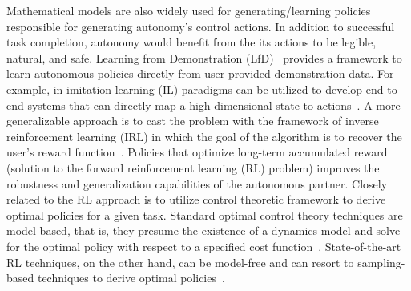 \documentclass[12pt]{article}
\begin{document}
Mathematical models are also widely used for generating/learning policies responsible for generating autonomy's control actions. In addition to successful task completion, autonomy would benefit from the its actions to be legible, natural, and safe. Learning from Demonstration (LfD)~\cite{argall2009survey} provides a framework to learn autonomous policies directly from user-provided demonstration data. For example, in imitation learning (IL) paradigms can be utilized to develop end-to-end systems that can directly map a high dimensional state to actions~\cite{bojarski2016end}. A more generalizable approach is to cast the problem with the framework of inverse reinforcement learning (IRL) in which the goal of the algorithm is to recover the user's reward function~\cite{ziebart2008maximum}.  Policies that optimize long-term accumulated reward (solution to the forward reinforcement learning (RL) problem) improves the robustness and generalization capabilities of the autonomous partner. Closely related to the RL approach is to utilize control theoretic framework to derive optimal policies for a given task. Standard optimal control theory techniques are model-based, that is, they presume the existence of a dynamics model and solve for the optimal policy with respect to a specified cost function~\cite{kirk1970optimal}. State-of-the-art RL techniques, on the other hand, can be model-free and can resort to sampling-based techniques to derive optimal policies~\cite{watkins1992q}. 
\end{document}
